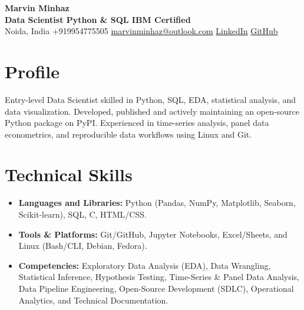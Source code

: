 \documentclass[10pt, a4paper]{article}
\begin{document}
	\pagestyle{empty}
	
	\begin{center}
		{\Huge \textbf{Marvin Minhaz}}\\[0.5em]
		\textbf{Data Scientist \textbar \space Python \& SQL \textbar \space IBM Certified}\\[0.2em]
		Noida, India \textbar\space +919954775505 \textbar\space \href{mailto:marvinminhaz@outlook.com}{marvinminhaz@outlook.com} \textbar\space \href{https://linkedin.com/in/marvinminhaz}{LinkedIn} \textbar\space \href{https://github.com/marvinminhaz}{GitHub}
	\end{center}
	
	
	
	\section{Profile}
	\noindent Entry-level Data Scientist skilled in Python, SQL, EDA, statistical analysis, and data visualization. Developed, published and actively maintaining an open-source Python package on PyPI. Experienced in time-series analysis, panel data econometrics, and reproducible data workflows using Linux and Git.
	
	
	
	\section{Technical Skills}
	\begin{itemize}[leftmargin=0in, label={}]
		\item \textbf{Languages and Libraries:} Python (Pandas, NumPy, Matplotlib, Seaborn, Scikit-learn), SQL, C, HTML/CSS.
		\item \textbf{Tools \& Platforms:} Git/GitHub, Jupyter Notebooks, Excel/Sheets, and Linux (Bash/CLI, Debian, Fedora).
		
		\item \textbf{Competencies:} Exploratory Data Analysis (EDA), Data Wrangling, Statistical Inference, Hypothesis Testing, Time-Series \& Panel Data Analysis, Data Pipeline Engineering, Open-Source Development (SDLC), Operational Analytics, and Technical Documentation.
	
	\end{itemize}
	
	
	
\end{document}
